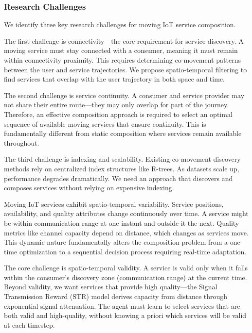 \documentclass[
  10pt,
  twocolumn,
]{article}
\begin{document}
\hypertarget{research-challenges}{%
	\subsubsection{Research Challenges}\label{research-challenges}}

We identify three key research challenges for moving IoT service
composition.

The first challenge is connectivity---the core requirement for service
discovery. A moving service must stay connected with a consumer, meaning
it must remain within connectivity proximity. This requires determining
co-movement patterns between the user and service trajectories. We
propose spatio-temporal filtering to find services that overlap with the
user trajectory in both space and time.

The second challenge is service continuity. A consumer and service
provider may not share their entire route---they may only overlap for
part of the journey. Therefore, an effective composition approach is
required to select an optimal sequence of available moving services that
ensure continuity. This is fundamentally different from static
composition where services remain available throughout.

The third challenge is indexing and scalability. Existing co-movement
discovery methods rely on centralized index structures like R-trees. As
datasets scale up, performance degrades dramatically. We need an
approach that discovers and composes services without relying on
expensive indexing.

Moving IoT services exhibit spatio-temporal variability. Service
positions, availability, and quality attributes change continuously over
time. A service might be within communication range at one instant and
outside it the next. Quality metrics like channel capacity depend on
distance, which changes as services move. This dynamic nature
fundamentally alters the composition problem from a one-time
optimization to a sequential decision process requiring real-time
adaptation.

The core challenge is spatio-temporal validity. A service is valid only
when it falls within the consumer's discovery zone (communication range)
at the current time. Beyond validity, we want services that provide high
quality---the Signal Transmission Reward (STR) model derives capacity
from distance through exponential signal attenuation. The agent must
learn to select services that are both valid and high-quality, without
knowing a priori which services will be valid at each timestep.
\end{document}
